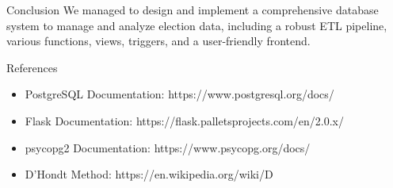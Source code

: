 \documentclass{beamer}
\begin{document}
\begin{frame}{Conclusion}
    We managed to design and implement a comprehensive database 
    system to manage and analyze election data, 
    including a robust ETL pipeline, various functions,
     views, triggers, and a user-friendly frontend. 
\end{frame}


\begin{frame}{References}
    \begin{itemize}
        \item PostgreSQL Documentation: https://www.postgresql.org/docs/
        \item Flask Documentation: https://flask.palletsprojects.com/en/2.0.x/
        \item psycopg2 Documentation: https://www.psycopg.org/docs/
        \item D'Hondt Method: https://en.wikipedia.org/wiki/D%
    \end{itemize}
\end{frame}
\end{document}
